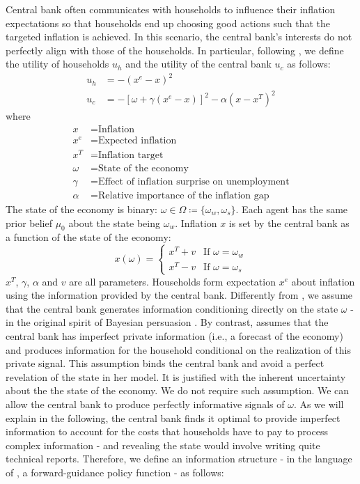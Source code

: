 \documentclass[12pt,a4paper]{article}
\begin{document}
Central bank often communicates with households to influence their inflation expectations so that households end up choosing good actions such that the targeted inflation is achieved. In this scenario, the central bank's interests do not perfectly align with those of the households. In particular, following \cite{Ko2022}, we define the utility of households $u_h$ and the utility of the central bank $u_c$ as follows:
\begin{align}
    \label{uh}
    u_h & = -\left(x^e - x\right)^2 \\
    \label{uc}
    u_c & = -\left[\omega+\gamma(x^e-x)\right]^2-\alpha(x-x^T)^2
\end{align}
where
\begin{align*}
    x & = \mbox{Inflation} \\
    x^e & = \mbox{Expected inflation} \\
    x^T & = \mbox{Inflation target} \\
    \omega & = \mbox{State of the economy}\\
    \gamma & = \mbox{Effect of inflation surprise on unemployment} \\
    \alpha & = \mbox{Relative importance of the inflation gap} 
\end{align*}
The state of the economy is binary: $\omega\in\Omega\coloneqq\{\omega_w,\omega_s\}$. Each agent has the same prior belief $\mu_0$ about the state being $\omega_w$. Inflation $x$ is set by the central bank as a function of the state of the economy: 
\begin{equation}
    x(\omega)=\left\{
    \begin{array}{cc}
      x^T+v   &  \mbox{If } \omega=\omega_w\\
      x^T-v   &  \mbox{If } \omega=\omega_s
    \end{array}
    \right.
\end{equation}
$x^T$, $\gamma$, $\alpha$ and $v$ are all parameters. Households form expectation $x^e$ about inflation using the information provided by the central bank. Differently from \cite{Ko2022}, we assume that the central bank generates information conditioning directly on the state $\omega$ - in the original spirit of Bayesian persuasion \citep{KG2011}. By contrast, \cite{Ko2022} assumes that the central bank has imperfect private information (i.e., a forecast of the economy) and produces information for the household conditional on the realization of this private signal. This assumption binds the central bank and avoid a perfect revelation of the state in her model. It is justified with the inherent uncertainty about the the state of the economy. We do not require such assumption. We can allow the central bank to produce perfectly informative signals of $\omega$. As we will explain in the following, the central bank finds it optimal to provide imperfect information to account for the costs that households have to pay to process complex information - and revealing the state would involve writing quite technical reports. Therefore, we define an information structure - in the language of \cite{Ko2022}, a forward-guidance policy function - as follows: 
\end{document}

